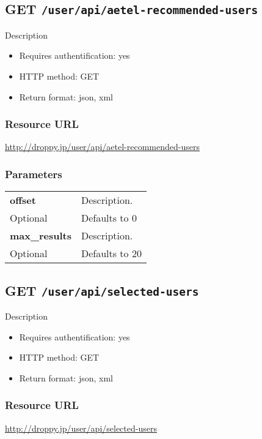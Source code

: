 \documentclass[11pt,a4paper]{article}
\newcommand{\content}[1]{\begin{minipage}{10cm}\vspace{2mm}#1\vspace{2mm}\end{minipage}}
\begin{document}
      \newpage
      
      
  \subsection*{GET {\tt /user/api/aetel-recommended-users}}
  Description
  \begin{itemize}
  \item Requires authentification: yes
  \item HTTP method: GET
  \item Return format: json, xml
  \end{itemize}
  \subsubsection*{Resource URL}
  \url{http://droppy.jp/user/api/aetel-recommended-users}
  \subsubsection*{Parameters}
  \begin{table}[h]
    \begin{center}
      \begin{tabular}{l l}
        \hline 
      \textbf{offset} & \content{Description. }
      \\
      Optional & Defaults to 0\\
      \hline
      \textbf{max\_results} & \content{Description. }
      \\
      Optional & Defaults to 20\\
      \hline
      \end{tabular}
    \end{center}
  \end{table}
  
      \newpage
      
      
  \subsection*{GET {\tt /user/api/selected-users}}
  Description
  \begin{itemize}
  \item Requires authentification: yes
  \item HTTP method: GET
  \item Return format: json, xml
  \end{itemize}
  \subsubsection*{Resource URL}
  \url{http://droppy.jp/user/api/selected-users}
\end{document}
